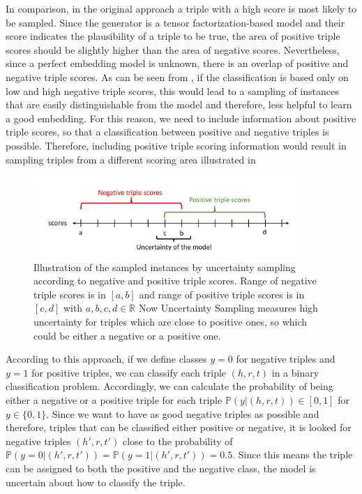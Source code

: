 In comparison, in the original \kbgan approach a triple with a high score is most likely to be sampled.
Since the generator is a tensor factorization-based model and their score indicates the plausibility of a triple to be true, the area of positive triple scores should be slightly higher than the area of negative scores.
Nevertheless, since a perfect embedding model is unknown, there is an overlap of positive and negative triple scores.
As can be seen from , if the classification is based only on low and high negative triple scores, this would lead to a sampling of instances that are easily distinguishable from the model and therefore, less helpful to learn a good embedding.
For this reason, we need to include information about positive triple scores, so that a classification between positive and negative triples is possible.
Therefore, including positive triple scoring information would result in sampling triples from a different scoring area illustrated in 
\begin{figure}[H]
  \centering
    \includegraphics[width=0.9\textwidth]{figures/positiveVsNegativeApproach.pdf}
  \caption{Illustration of the sampled instances by uncertainty sampling according to negative and positive triple scores.
  Range of negative triple scores is in $[a, b]$ and range of positive triple scores is in  $[c, d]$ with $a,b,c,d \in \mathbb{R}$
  Now Uncertainty Sampling measures high uncertainty for triples which are close to positive ones, so which could be either a negative or a positive one.}
  \label{fig:positiveVsNegativeApproach}
\end{figure}
According to this approach, if we define classes $y = 0$  for negative triples and $y = 1$ for positive triples, we can classify each triple $(h,r,t)$ in a binary classification problem.
Accordingly, we can calculate the probability of being either a negative or a positive triple for each triple $\mathbb{P}(y| (h,r,t)) \in [0,1]$ for $y \in \{0,1\}$.
Since we want to have as good negative triples as possible and therefore, triples that can be classified either positive or negative, it is looked for negative triples $(h',r,t')$ close to the probability of $\mathbb{P}(y = 0| (h',r,t')) = \mathbb{P}(y = 1| (h',r,t')) = 0.5$.
Since this means the triple can be assigned to both the positive and the negative class, the model is uncertain about how to classify the triple.
\clearpage